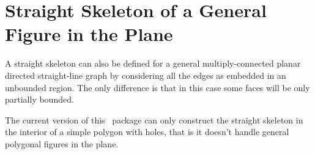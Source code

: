 \section{Straight Skeleton of a General Figure in the Plane}

A straight skeleton can also be defined for a general
multiply-connected planar directed straight-line graph \cite{aa-skfgpf-95} by considering
all the edges as embedded in an unbounded region. The only difference
is that in this case some faces will be only partially bounded.


The current version of this \cgal\ package can only construct the
straight skeleton in the interior of a simple polygon with holes, that is it
doesn't handle general polygonal figures in the plane.


